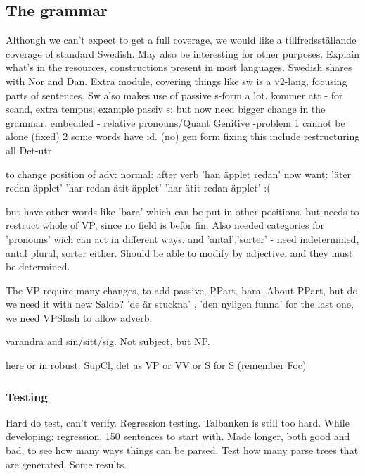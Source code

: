 \documentclass{article}
\begin{document}
\subsection{The grammar}
Although we can't expect to get a full coverage, we would like a tillfredsställande
coverage of standard Swedish. May also be interesting for other purposes.
Explain what's in the resources, constructions present in most languages. 
Swedish shares with Nor and Dan. Extra module, covering things like sw is a
v2-lang, focusing parts of sentences. Sw also makes use of passive s-form a lot.
kommer att - for scand, extra tempus, example
passiv s: but now need bigger change in the grammar. 
embedded - relative
pronouns/Quant
Genitive -problem 1 cannot be alone (fixed) 2 some words have id. (no) gen form
           fixing this include restructuring all
Det-utr

to change position of adv:
normal: after verb 'han äpplet redan'
now want: 'äter redan äpplet'
          'har redan ätit äpplet' 
          'har ätit redan äpplet' :(

but have other words like 'bara' which can be put in other positions.
  but needs to restruct whole of VP, since no field is befor fin.
Also needed categories for 'pronouns' wich can act in different ways.
and 'antal','sorter' - need indetermined, antal plural, sorter either.
Should be able to modify by adjective, and they must be determined.

The VP require many changes, to add passive, PPart, bara.
About PPart, but do we need it with new Saldo? 'de är stuckna' , 'den nyligen funna'
for the last one, we need VPSlash to allow adverb.

varandra and sin/sitt/sig. Not subject, but NP.

here or in robust: SupCl, det as VP or VV or S for S (remember Foc)

\subsubsection{Testing}
Hard do test, can't verify. Regression testing. Talbanken is still too hard.
While developing: regression, 150 sentences to start with. Made longer, both good and bad,
to see how many ways things can be parsed.
Test how many parse trees that are generated.
Some results.

\end{document}
